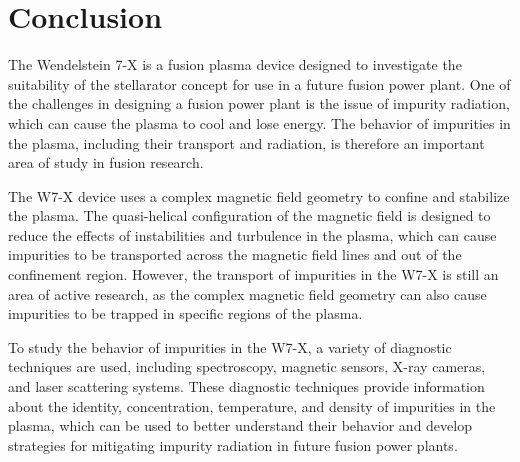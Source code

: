 \documentclass[12pt]{article}
\begin{document}
\section{Conclusion}

The Wendelstein 7-X is a fusion plasma device designed to investigate the suitability of the stellarator concept for use in a future fusion power plant. One of the challenges in designing a fusion power plant is the issue of impurity radiation, which can cause the plasma to cool and lose energy. The behavior of impurities in the plasma, including their transport and radiation, is therefore an important area of study in fusion research.

The W7-X device uses a complex magnetic field geometry to confine and stabilize the plasma. The quasi-helical configuration of the magnetic field is designed to reduce the effects of instabilities and turbulence in the plasma, which can cause impurities to be transported across the magnetic field lines and out of the confinement region. However, the transport of impurities in the W7-X is still an area of active research, as the complex magnetic field geometry can also cause impurities to be trapped in specific regions of the plasma.

To study the behavior of impurities in the W7-X, a variety of diagnostic techniques are used, including spectroscopy, magnetic sensors, X-ray cameras, and laser scattering systems. These diagnostic techniques provide information about the identity, concentration, temperature, and density of impurities in the plasma, which can be used to better understand their behavior and develop strategies for mitigating impurity radiation in future fusion power plants.
\end{document}
